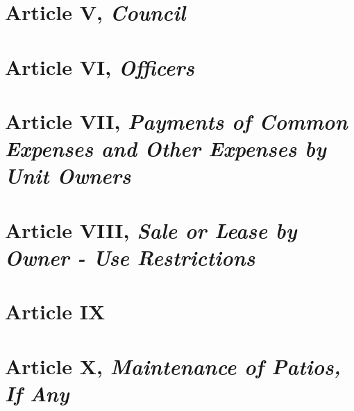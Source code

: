 \documentclass[
]{book}
\begin{document}
\hypertarget{article-v-council}{%
\section*{\texorpdfstring{Article V, \emph{Council}}{Article V, Council}}\label{article-v-council}}

\hypertarget{article-vi-officers}{%
\section*{\texorpdfstring{Article VI, \emph{Officers}}{Article VI, Officers}}\label{article-vi-officers}}

\hypertarget{article-vii-payments-of-common-expenses-and-other-expenses-by-unit-owners}{%
\section*{\texorpdfstring{Article VII, \emph{Payments of Common Expenses and Other Expenses by Unit Owners}}{Article VII, Payments of Common Expenses and Other Expenses by Unit Owners}}\label{article-vii-payments-of-common-expenses-and-other-expenses-by-unit-owners}}

\hypertarget{article-viii-sale-or-lease-by-owner---use-restrictions}{%
\section*{\texorpdfstring{Article VIII, \emph{Sale or Lease by Owner - Use Restrictions}}{Article VIII, Sale or Lease by Owner - Use Restrictions}}\label{article-viii-sale-or-lease-by-owner---use-restrictions}}

\hypertarget{article-ix}{%
\section*{Article IX}\label{article-ix}}

\hypertarget{article-x-maintenance-of-patios-if-any}{%
\section*{\texorpdfstring{Article X, \emph{Maintenance of Patios, If Any}}{Article X, Maintenance of Patios, If Any}}\label{article-x-maintenance-of-patios-if-any}}
\end{document}
